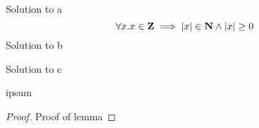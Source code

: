 \documentclass{6046}
\author{Ben Bitdiddle}
\begin{document}
\problempart  
Solution to a
$$\forall x. x \in \mathbf{Z} \implies \left| x\right| \in \mathbf{N} \land \left| x\right| \ge 0$$
\problempart
Solution to b

\newpage %
\problempart
Solution to c

\problempart  
\begin{lemma}[Lorem]
ipsum
\end{lemma}
\begin{proof}
Proof of lemma
\end{proof}
\problempart
\problempart
\end{document}
